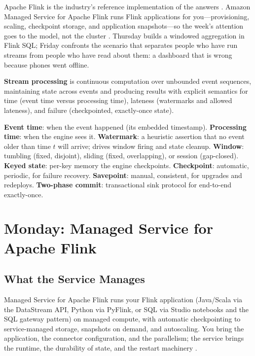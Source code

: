 Apache Flink is the industry's reference implementation of the answers \cite{apacheFlinkDocs,akidauStreamingSystems}. Amazon Managed Service for Apache Flink runs Flink applications for you---provisioning, scaling, checkpoint storage, and application snapshots---so the week's attention goes to the model, not the cluster \cite{awsManagedFlinkDocs}. Thursday builds a windowed aggregation in Flink SQL; Friday confronts the scenario that separates people who have run streams from people who have read about them: a dashboard that is wrong because phones went offline.

\begin{definitionbox}
\textbf{Stream processing} is continuous computation over unbounded event sequences, maintaining state across events and producing results with explicit semantics for time (event time versus processing time), lateness (watermarks and allowed lateness), and failure (checkpointed, exactly-once state).
\end{definitionbox}

\begin{keyterms}
\textbf{Event time}: when the event happened (its embedded timestamp). \textbf{Processing time}: when the engine sees it. \textbf{Watermark}: a heuristic assertion that no event older than time $t$ will arrive; drives window firing and state cleanup. \textbf{Window}: tumbling (fixed, disjoint), sliding (fixed, overlapping), or session (gap-closed). \textbf{Keyed state}: per-key memory the engine checkpoints. \textbf{Checkpoint}: automatic, periodic, for failure recovery. \textbf{Savepoint}: manual, consistent, for upgrades and redeploys. \textbf{Two-phase commit}: transactional sink protocol for end-to-end exactly-once.
\end{keyterms}

\section{Monday: Managed Service for Apache Flink}
\subsection{What the Service Manages}
Managed Service for Apache Flink runs your Flink application (Java/Scala via the DataStream API, Python via PyFlink, or SQL via Studio notebooks and the SQL gateway pattern) on managed compute, with automatic checkpointing to service-managed storage, snapshots on demand, and autoscaling. You bring the application, the connector configuration, and the parallelism; the service brings the runtime, the durability of state, and the restart machinery \cite{awsManagedFlinkDocs}.

